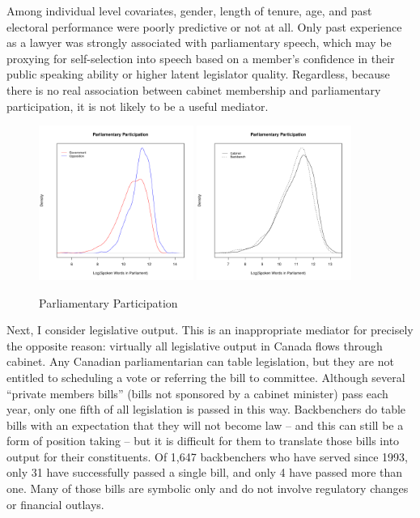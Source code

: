 \documentclass[letter,12pt]{article}
\begin{document}
Among individual level covariates, gender, length of tenure, age, and past electoral performance were poorly predictive or not at all. Only past experience as a lawyer was strongly associated with parliamentary speech, which may be proxying for self-selection into speech based on a member's confidence in their public speaking ability or higher latent legislator quality. Regardless, because there is no real association between cabinet membership and parliamentary participation, it is not likely to be a useful mediator.

\begin{figure}
\centering
\caption{Parliamentary Participation}
\includegraphics[width=0.45\textwidth]{"Includes/participation_govopp"}
\includegraphics[width=0.45\textwidth]{"Includes/participation_cabinet"}
\end{figure}

Next, I consider legislative output. This is an inappropriate mediator for precisely the opposite reason: virtually all legislative output in Canada flows through cabinet. Any Canadian parliamentarian can table legislation, but they are not entitled to scheduling a vote or referring the bill to committee. Although several ``private members bills'' (bills not sponsored by a cabinet minister) pass each year, only one fifth of all legislation is passed in this way. Backbenchers do table bills with an expectation that they will not become law -- and this can still be a form of position taking -- but it is difficult for them to translate those bills into output for their constituents. Of 1,647 backbenchers who have served since 1993, only 31 have successfully passed a single bill, and only 4 have passed more than one. Many of those bills are symbolic only and do not involve regulatory changes or financial outlays.
\end{document}
